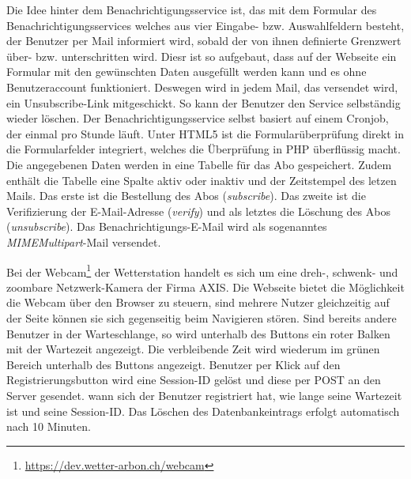 \documentclass[11pt]{article}
\begin{document}
\begin{multicols}{2}
Die Idee hinter dem Benachrichtigungsservice ist, das mit dem  Formular des Benachrichtigungsservices welches aus vier Eingabe- bzw. Auswahlfeldern besteht, der Benutzer per Mail informiert wird, sobald der von ihnen definierte Grenzwert über- bzw. unterschritten wird.  Diesr ist so aufgebaut, dass auf der Webseite ein Formular mit den gewünschten Daten ausgefüllt werden kann und es ohne Benutzeraccount funktioniert. Deswegen wird in jedem Mail, das versendet wird, ein Unsubscribe-Link mitgeschickt. So kann der Benutzer den Service selbständig wieder löschen. Der Benachrichtigungsservice selbst basiert auf einem Cronjob, der einmal pro Stunde läuft.  Unter HTML5 ist die Formularüberprüfung direkt in die Formularfelder integriert, welches die Überprüfung in PHP überflüssig macht. Die angegebenen Daten werden in eine Tabelle für das Abo gespeichert. Zudem enthält die Tabelle eine Spalte aktiv oder inaktiv und der Zeitstempel des letzen Mails. Das erste ist die Bestellung des Abos (\textit{subscribe}). Das zweite ist die Verifizierung der E-Mail-Adresse (\textit{verify}) und als letztes die Löschung des Abos (\textit{unsubscribe}). Das Benachrichtigungs-E-Mail wird als sogenanntes \emph{MIMEMultipart}-Mail versendet.

Bei der Webcam\footnote{\url{https://dev.wetter-arbon.ch/webcam}} der Wetterstation handelt es sich um eine dreh-, schwenk- und zoombare Netzwerk-Kamera der Firma AXIS. Die Webseite bietet die Möglichkeit die Webcam über den Browser zu steuern, sind mehrere Nutzer gleichzeitig auf der Seite können sie sich gegenseitig beim Navigieren stören. Sind bereits andere Benutzer in der Warteschlange, so wird unterhalb des Buttons ein roter Balken mit der Wartezeit angezeigt. Die verbleibende Zeit wird wiederum im grünen Bereich unterhalb des Buttons angezeigt. Benutzer per Klick auf den Registrierungsbutton wird eine Session-ID gelöst und diese per POST an den Server gesendet. wann sich der Benutzer registriert hat, wie lange seine Wartezeit ist und seine Session-ID. Das Löschen des Datenbankeintrags erfolgt automatisch nach 10 Minuten.




\end{multicols}
 
\end{document}
